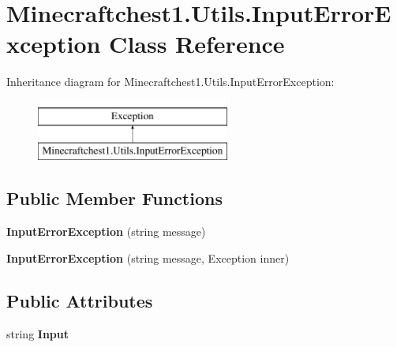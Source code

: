 \hypertarget{class_minecraftchest1_1_1_utils_1_1_input_error_exception}{}\section{Minecraftchest1.\+Utils.\+Input\+Error\+Exception Class Reference}
\label{class_minecraftchest1_1_1_utils_1_1_input_error_exception}
Inheritance diagram for Minecraftchest1.\+Utils.\+Input\+Error\+Exception\+:\begin{figure}[H]
\begin{center}
\leavevmode
\includegraphics[height=2.000000cm]{class_minecraftchest1_1_1_utils_1_1_input_error_exception}
\end{center}
\end{figure}
\subsection*{Public Member Functions}
\begin{DoxyCompactItemize}
\item 
\mbox{\label{class_minecraftchest1_1_1_utils_1_1_input_error_exception_a1bda68cd00bf63e46e593edaf8a5e57b}} 
{\bfseries Input\+Error\+Exception} (string message)
\item 
\mbox{\label{class_minecraftchest1_1_1_utils_1_1_input_error_exception_a38a7a2f9f54188ccd25a524886dd77d4}} 
{\bfseries Input\+Error\+Exception} (string message, Exception inner)
\end{DoxyCompactItemize}
\subsection*{Public Attributes}
\begin{DoxyCompactItemize}
\item 
\mbox{\label{class_minecraftchest1_1_1_utils_1_1_input_error_exception_a9da985457dab9915b3cd79cb13cc6683}} 
string {\bfseries Input}
\end{DoxyCompactItemize}
